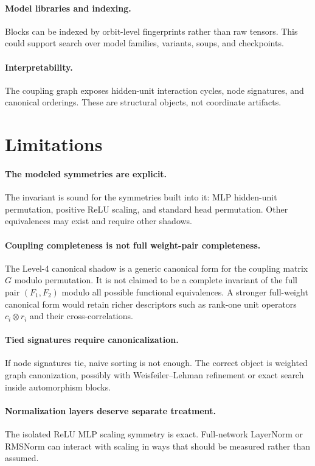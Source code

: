 \documentclass[11pt]{article}
\begin{document}
\paragraph{Model libraries and indexing.} Blocks can be indexed by orbit-level fingerprints rather than raw tensors. This could support search over model families, variants, soups, and checkpoints.

\paragraph{Interpretability.} The coupling graph exposes hidden-unit interaction cycles, node signatures, and canonical orderings. These are structural objects, not coordinate artifacts.

\section{Limitations}

\paragraph{The modeled symmetries are explicit.} The invariant is sound for the symmetries built into it: MLP hidden-unit permutation, positive ReLU scaling, and standard head permutation. Other equivalences may exist and require other shadows.

\paragraph{Coupling completeness is not full weight-pair completeness.} The Level-4 canonical shadow is a generic canonical form for the coupling matrix $G$ modulo permutation. It is not claimed to be a complete invariant of the full pair $(F_1,F_2)$ modulo all possible functional equivalences. A stronger full-weight canonical form would retain richer descriptors such as rank-one unit operators $c_i\otimes r_i$ and their cross-correlations.

\paragraph{Tied signatures require canonicalization.} If node signatures tie, naive sorting is not enough. The correct object is weighted graph canonization, possibly with Weisfeiler--Lehman refinement or exact search inside automorphism blocks.

\paragraph{Normalization layers deserve separate treatment.} The isolated ReLU MLP scaling symmetry is exact. Full-network LayerNorm or RMSNorm can interact with scaling in ways that should be measured rather than assumed.
\end{document}
